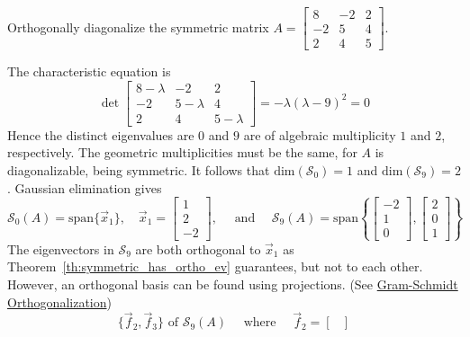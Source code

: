 \documentclass{ximera}
\begin{document}
\begin{example}\label{exa:ortho_diag_symm}
Orthogonally diagonalize the symmetric matrix $A = \begin{bmatrix}
8 & -2 & 2 \\
-2 & 5 & 4 \\
2 & 4 & 5
\end{bmatrix}$.


\begin{explanation}
  The characteristic equation is
\begin{equation*}
\det  \begin{bmatrix}
8-\lambda & -2 & 2 \\
-2 & 5-\lambda & 4 \\
2 & 4 & 5-\lambda
\end{bmatrix} = -\lambda(\lambda-9)^2=0
\end{equation*}
Hence the distinct eigenvalues are $0$ and $9$ are of algebraic multiplicity $1$ and $2$, respectively.  The geometric multiplicities must be the same, for $A$ is diagonalizable, being symmetric. It follows that $\mbox{dim}(\mathcal{S}_0) = 1$ and $\mbox{dim}(\mathcal{S}_9) = 2$.  Gaussian elimination gives
\begin{equation*}
\mathcal{S}_{0}(A) = \mbox{span}\{\vec{x}_{1}\}, \quad \vec{x}_{1} = \begin{bmatrix}
1 \\
2 \\
-2
\end{bmatrix}, \quad \mbox{ and } \quad \mathcal{S}_{9}(A) = \mbox{span} \left\lbrace \begin{bmatrix}
	-2 \\
	1 \\
	0
	\end{bmatrix}, \begin{bmatrix}
2 \\
0 \\
1
\end{bmatrix} \right\rbrace
\end{equation*}
The eigenvectors in $\mathcal{S}_{9}$ are both orthogonal to $\vec{x}_{1}$ as Theorem~\ref{th:symmetric_has_ortho_ev} guarantees, but not to each other. However, an orthogonal basis can be found using projections. (See \href{https://ximera.osu.edu/corela/LinearAlgebraInteractiveIntro/RTH-0015/main}{Gram-Schmidt Orthogonalization})
\begin{equation*}
\{\vec{f}_{2}, \vec{f}_{3}\} \mbox{ of } \mathcal{S}_{9}(A) \quad \mbox{ where } \quad \vec{f}_{2} = \begin{bmatrix}

\end{bmatrix}
\end{equation*}
\end{explanation}
\end{example}
\end{document}
